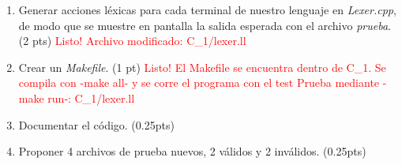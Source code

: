 \documentclass[11pt]{report}
\begin{document}
\begin{enumerate}
    uno en \textit{lexer.ll}. (2 pts)
    \textcolor{red}{Listo! Archivo modificado: C\_1/lexer.ll}
  \item Generar acciones léxicas para cada terminal de nuestro lenguaje en \textit{Lexer.cpp},
    de modo que se muestre en pantalla la salida esperada con el archivo \textit{prueba}. (2 pts)
    \textcolor{red}{Listo! Archivo modificado: C\_1/lexer.ll}
  \item Crear un \textit{Makefile}. (1 pt) \textcolor{red}{Listo! El Makefile se encuentra dentro de C\_1. Se compila con -make all- y se corre el programa con el test Prueba mediante -make run-: C\_1/lexer.ll}
  \item Documentar el código. (0.25pts)
  \item Proponer 4 archivos de prueba nuevos, 2 válidos y 2 inválidos. (0.25pts)
\end{enumerate}
\end{document}
